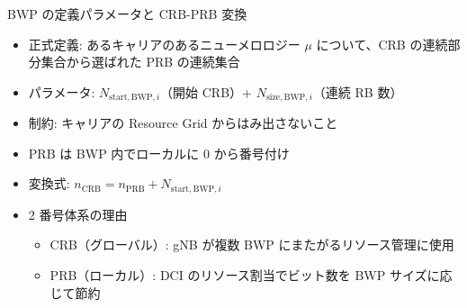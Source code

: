 \begin{frame}{BWP の定義パラメータと CRB-PRB 変換}
\begin{itemize}
  \item 正式定義: あるキャリアのあるニューメロロジー $\mu$ について、CRB の連続部分集合から選ばれた PRB の連続集合
  \item パラメータ: $N_{\mathrm{start,BWP},i}$（開始 CRB）+ $N_{\mathrm{size,BWP},i}$（連続 RB 数）
  \item 制約: キャリアの Resource Grid からはみ出さないこと
  \item PRB は BWP 内でローカルに 0 から番号付け
  \item 変換式: $n_{\mathrm{CRB}} = n_{\mathrm{PRB}} + N_{\mathrm{start,BWP},i}$
  \item 2 番号体系の理由
    \begin{itemize}
      \item CRB（グローバル）: gNB が複数 BWP にまたがるリソース管理に使用
      \item PRB（ローカル）: DCI のリソース割当でビット数を BWP サイズに応じて節約
    \end{itemize}
\end{itemize}
\end{frame}
